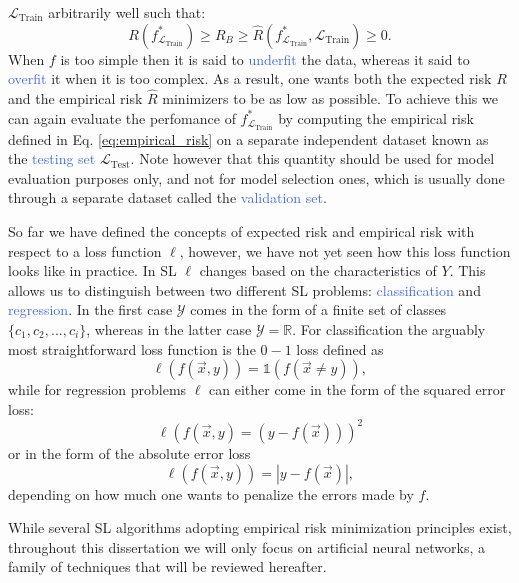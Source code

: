 $\mathcal{L}_{\text{Train}}$ arbitrarily well such that:
\begin{equation}
	R(f^{*}_{\mathcal{L}_{\text{Train}}}) \geq R_B \geq \hat{R}(f^{*}_{\mathcal{L}_{\text{Train}}},\mathcal{L}_{\text{Train}}) \geq 0.
\end{equation}
When $f$ is too simple then it is said to \textcolor{RoyalBlue}{underfit} the data, whereas it said to \textcolor{RoyalBlue}{overfit} it when it is too complex. As a result, one wants both the expected risk $R$ and the empirical risk $\hat{R}$ minimizers to be as low as possible. To achieve this we can again evaluate the perfomance of $f^{*}_{\mathcal{L}_{\text{Train}}}$ by computing the empirical risk defined in Eq. \ref{eq:empirical_risk} on a separate independent dataset known as the \textcolor{RoyalBlue}{testing set} $\mathcal{L}_{\text{Test}}$. Note however that this quantity should be used for model evaluation purposes only, and not for model selection ones, which is usually done through a separate dataset called the \textcolor{RoyalBlue}{validation set}. 

So far we have defined the concepts of expected risk and empirical risk with respect to a loss function $\ell$, however, we have not yet seen how this loss function looks like in practice. In SL $\ell$ changes based on the characteristics of $Y$. This allows us to distinguish between two different SL problems: \textcolor{RoyalBlue}{classification} and \textcolor{RoyalBlue}{regression}. In the first case $\mathcal{Y}$ comes in the form of a finite set of classes $\{c_1, c_2,...,c_i\}$, whereas in the latter case $\mathcal{Y}=\mathds{R}$. For classification the arguably most straightforward loss function is the $0-1$ loss defined as 
\begin{equation}
	\ell(f(\vec{x},y)) = \mathbb{1}(f(\vec{x}\neq y)),
\end{equation}
while for regression problems $\ell$ can either come in the form of the squared error loss:
\begin{equation}
	\ell(f(\vec{x},y)=(y-f(\vec{x})))^2
\end{equation}
or in the form of the absolute error loss
\begin{equation}
	\ell(f(\vec{x},y))=|y-f(\vec{x})|,
\end{equation}
depending on how much one wants to penalize the errors made by $f$.

While several SL algorithms adopting empirical risk minimization principles exist, throughout this dissertation we will only focus on artificial neural networks, a family of techniques that will be reviewed hereafter.  

